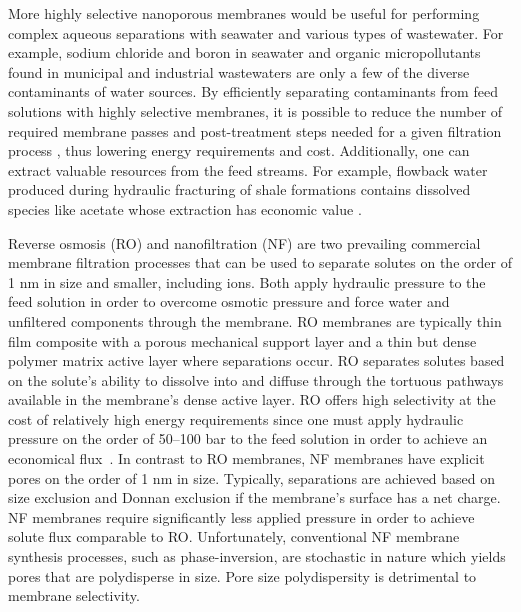 \documentclass{article}
\begin{document}
  More highly selective nanoporous membranes would be useful for 
  performing complex aqueous separations with seawater and various
  types of wastewater. For example, sodium chloride and boron in seawater 
  \cite{fritzmann_state---art_2007} and organic micropollutants found in
  municipal and industrial wastewaters \cite{schwarzenbach_challenge_2006}
  are only a few 
  of the diverse contaminants of water sources. 
  By efficiently separating contaminants from feed solutions with
  highly selective membranes, it is possible to reduce the number of 
  required membrane passes and post-treatment steps needed for a given 
  filtration process \cite{werber_materials_2016}, thus lowering energy 
  requirements and cost. Additionally, one can extract valuable 
  resources from the feed streams. For example, flowback water produced 
  during hydraulic fracturing of shale formations contains dissolved 
  species like acetate whose extraction has economic value \cite{dischinger_application_2017}.

  Reverse osmosis (RO) and nanofiltration (NF) are two prevailing commercial membrane
  filtration processes that can be used to separate solutes on the order of
  1 nm in size and smaller, including ions. Both apply hydraulic pressure 
  to the feed solution in order to overcome osmotic pressure and force water
  and unfiltered components through the membrane. RO membranes are typically
  thin film composite with a porous mechanical support layer and a thin but
  dense polymer matrix active layer where separations occur.\cite{jeong_interfacial_2007}
  RO separates solutes based on the solute's ability to dissolve into and 
  diffuse through the tortuous pathways available in the membrane's dense 
  active layer. RO offers high selectivity at the cost of relatively high 
  energy requirements since one must apply hydraulic pressure on the order of
  50--100 bar to the feed solution in order to achieve an economical flux~\cite{van_der_bruggen_review_2003}.
  In contrast to RO membranes, NF membranes have explicit pores on the order
  of 1 nm in size. Typically, separations are achieved based on size exclusion
  and Donnan exclusion if the membrane's surface has a net charge.~\cite{donnan_theory_1995}
  NF membranes require significantly less applied pressure in order to achieve solute flux
  comparable to RO. Unfortunately, conventional NF membrane synthesis processes, such as 
  phase-inversion\cite{smolders_microstructures_1992}, are stochastic in
  nature which yields pores that are polydisperse in size.\cite{werber_materials_2016}
  Pore size polydispersity is detrimental to membrane selectivity.
  
\end{document}
